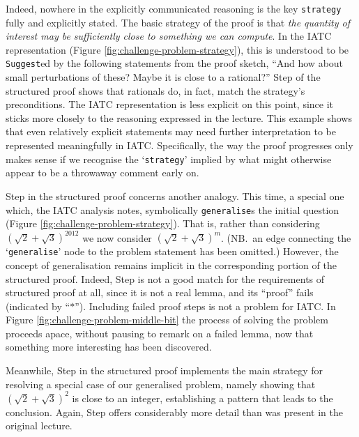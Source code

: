 \documentclass[smallextended,oneside]{svjour3}       %
\newcommand\nothing[1]{#1}
\let\paragraph\nothing
\begin{document}
\paragraph{Indeed, nowhere in the explicitly communicated reasoning is the key \texttt{strategy} fully and explicitly stated.}
The basic strategy of the proof is that \emph{the quantity of interest
  may be sufficiently close to something we can compute}.  In the IATC
representation (Figure \ref{fig:challenge-problem-strategy}), this is
understood to be \texttt{Suggest}ed by the following statements from
the proof sketch, ``And how about small perturbations of these?  Maybe
it is close to a rational?''  Step  of the structured proof
shows that rationals do, in fact, match the strategy's preconditions.
The IATC representation is less explicit on this point, since it
sticks more closely to the reasoning expressed in the lecture.  This
example shows that even relatively explicit statements may need
further interpretation to be represented meaningfully in IATC.
Specifically, the way the proof progresses only makes sense if we
recognise the `\texttt{strategy}' implied by what might otherwise
appear to be a throwaway comment early on.

\paragraph{Step  in the structured proof concerns another analogy.}
This time, a special one which, the IATC analysis notes,
symbolically \texttt{generalise}s the initial question (Figure
\ref{fig:challenge-problem-strategy}).  
That is, rather than considering $(\sqrt{2}+\sqrt{3})^{2012}$ we
now consider $(\sqrt{2}+\sqrt{3})^{m}$.
(NB.~an edge connecting the  `\texttt{generalise}' node to the problem statement has been omitted.)
However, the concept of generalisation remains implicit in the
corresponding portion of the structured proof.  Indeed, Step 
is not a good match for the requirements of structured proof at all,
since it is not a real lemma, and its ``proof'' fails (indicated by
``{\Large $\ast$}'').  Including failed proof steps is not a problem
for IATC.  In Figure \ref{fig:challenge-problem-middle-bit} the
process of solving the problem proceeds apace, without pausing to
remark on a failed lemma, now that something more interesting has been
discovered.

\paragraph{Meanwhile, Step  in the structured proof implements the main strategy for resolving a special case of our generalised problem, namely showing that $(\sqrt{2}+\sqrt{3})^{2}$ is close to an integer, establishing a pattern that leads to the conclusion.}
Again, Step  offers considerably more detail than was present in the
original lecture.
\end{document}
